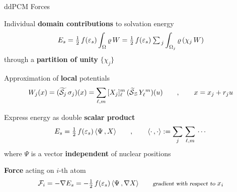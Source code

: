\begin{frame}{ddPCM Forces}

\begin{wideitemize}
\item Individual {\bf domain contributions} to solvation energy
\[
E_s = \tfrac{1}{2} \, f(\varepsilon_s) \int_\Omega \varrho \, W =  \tfrac{1}{2} \, f(\varepsilon_s) \: {\textstyle \sum_{\, j}} \int_{\Omega_j} \varrho \, (\chi_j \, W) %
 \displaybump
\]
through a {\bf partition of unity} $\{\chi_j\}$
\item Approximation of {\bf local} potentials
\[
W_j (x) = (\widetilde{\mathcal{S}_j} \, \sigma_j)(x) = \sum_{\ell,m} \, [X_j]_\ell^m \, (\widetilde{\mathcal{S}}_{\, \mathbb{S}} \, Y_\ell^{\,m})(u)
\qquad , \qquad x = x_j + r_j u  \displaybump
\]
\item Express energy as double {\bf scalar product}
\[
 E_s =\tfrac{1}{2} \,  f(\varepsilon_s) \, \langle   \Psi \, , X \rangle \qquad , \qquad \langle \cdot \, , \cdot \rangle :=  \sum_j \, \sum_{\ell,m} \, \cdots  \displaybump
 \]
where $\Psi$ is a vector {\bf independent} of nuclear positions
\item {\bf Force} acting on $i$-th atom
\[
\mathcal{F}_i = - \nabla E_s = - \tfrac{1}{2} \, f(\varepsilon_s)  \, \langle \Psi \, , \nabla X \rangle \qquad \textsl{\footnotesize gradient with respect to } x_i  \displaybump
\]

\end{wideitemize}

\end{frame}


